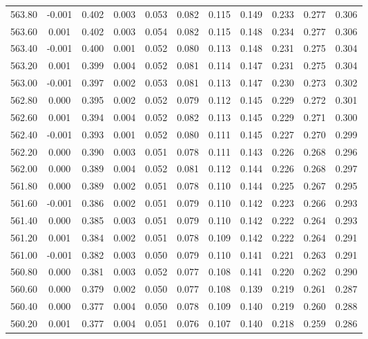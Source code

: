 \begin{longtable}{cccccccccc}
    563.80 & -0.001 &  0.402 &  0.003 &  0.053 &  0.082 &  0.115 &  0.149 &  0.233 &  0.277 &  0.306 \\
    563.60 &  0.001 &  0.402 &  0.003 &  0.054 &  0.082 &  0.115 &  0.148 &  0.234 &  0.277 &  0.306 \\
    563.40 & -0.001 &  0.400 &  0.001 &  0.052 &  0.080 &  0.113 &  0.148 &  0.231 &  0.275 &  0.304 \\
    563.20 &  0.001 &  0.399 &  0.004 &  0.052 &  0.081 &  0.114 &  0.147 &  0.231 &  0.275 &  0.304 \\
    563.00 & -0.001 &  0.397 &  0.002 &  0.053 &  0.081 &  0.113 &  0.147 &  0.230 &  0.273 &  0.302 \\
    562.80 &  0.000 &  0.395 &  0.002 &  0.052 &  0.079 &  0.112 &  0.145 &  0.229 &  0.272 &  0.301 \\
    562.60 &  0.001 &  0.394 &  0.004 &  0.052 &  0.082 &  0.113 &  0.145 &  0.229 &  0.271 &  0.300 \\
    562.40 & -0.001 &  0.393 &  0.001 &  0.052 &  0.080 &  0.111 &  0.145 &  0.227 &  0.270 &  0.299 \\
    562.20 &  0.000 &  0.390 &  0.003 &  0.051 &  0.078 &  0.111 &  0.143 &  0.226 &  0.268 &  0.296 \\
    562.00 &  0.000 &  0.389 &  0.004 &  0.052 &  0.081 &  0.112 &  0.144 &  0.226 &  0.268 &  0.297 \\
    561.80 &  0.000 &  0.389 &  0.002 &  0.051 &  0.078 &  0.110 &  0.144 &  0.225 &  0.267 &  0.295 \\
    561.60 & -0.001 &  0.386 &  0.002 &  0.051 &  0.079 &  0.110 &  0.142 &  0.223 &  0.266 &  0.293 \\
    561.40 &  0.000 &  0.385 &  0.003 &  0.051 &  0.079 &  0.110 &  0.142 &  0.222 &  0.264 &  0.293 \\
    561.20 &  0.001 &  0.384 &  0.002 &  0.051 &  0.078 &  0.109 &  0.142 &  0.222 &  0.264 &  0.291 \\
    561.00 & -0.001 &  0.382 &  0.003 &  0.050 &  0.079 &  0.110 &  0.141 &  0.221 &  0.263 &  0.291 \\
    560.80 &  0.000 &  0.381 &  0.003 &  0.052 &  0.077 &  0.108 &  0.141 &  0.220 &  0.262 &  0.290 \\
    560.60 &  0.000 &  0.379 &  0.002 &  0.050 &  0.077 &  0.108 &  0.139 &  0.219 &  0.261 &  0.287 \\
    560.40 &  0.000 &  0.377 &  0.004 &  0.050 &  0.078 &  0.109 &  0.140 &  0.219 &  0.260 &  0.288 \\
    560.20 &  0.001 &  0.377 &  0.004 &  0.051 &  0.076 &  0.107 &  0.140 &  0.218 &  0.259 &  0.286 \\

\end{longtable}

